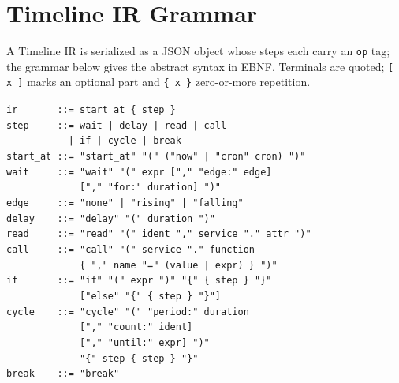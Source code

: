 \section{Timeline IR Grammar}
\label{app:grammar}

A Timeline IR is serialized as a JSON object whose steps each carry an \texttt{op} tag; the grammar below gives the abstract syntax in EBNF. Terminals are quoted; \texttt{[\,x\,]} marks an optional part and \texttt{\{\,x\,\}} zero-or-more repetition.

{\small
\begin{flushleft}
\texttt{ir \ \ \ \ \ \ ::= start\_at \{ step \}}\\
\texttt{step \ \ \ \ ::= wait | delay | read | call}\\
\texttt{\ \ \ \ \ \ \ \ \ \ \ | if | cycle | break}\\[3pt]
\texttt{start\_at ::= "start\_at" "(" ("now" | "cron" cron) ")"}\\
\texttt{wait \ \ \ \ ::= "wait" "(" expr ["," "edge:" edge]}\\
\texttt{\ \ \ \ \ \ \ \ \ \ \ \ \ ["," "for:" duration] ")"}\\
\texttt{edge \ \ \ \ ::= "none" | "rising" | "falling"}\\
\texttt{delay \ \ \ ::= "delay" "(" duration ")"}\\
\texttt{read \ \ \ \ ::= "read" "(" ident "," service "." attr ")"}\\
\texttt{call \ \ \ \ ::= "call" "(" service "." function}\\
\texttt{\ \ \ \ \ \ \ \ \ \ \ \ \ \{ "," name "=" (value | expr) \} ")"}\\
\texttt{if \ \ \ \ \ \ ::= "if" "(" expr ")" "\{" \{ step \} "\}"}\\
\texttt{\ \ \ \ \ \ \ \ \ \ \ \ \ ["else" "\{" \{ step \} "\}"]}\\
\texttt{cycle \ \ \ ::= "cycle" "(" "period:" duration}\\
\texttt{\ \ \ \ \ \ \ \ \ \ \ \ \ ["," "count:" ident]}\\
\texttt{\ \ \ \ \ \ \ \ \ \ \ \ \ ["," "until:" expr] ")"}\\
\texttt{\ \ \ \ \ \ \ \ \ \ \ \ \ "\{" step \{ step \} "\}"}\\
\texttt{break \ \ \ ::= "break"}\\[3pt]

\end{flushleft}}
